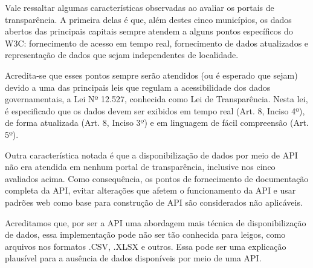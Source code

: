 Vale ressaltar algumas características observadas ao avaliar os portais de transparência. A primeira delas é que, além destes cinco municípios, os dados abertos das principais capitais sempre atendem a alguns pontos específicos do W3C: fornecimento de acesso em tempo real, fornecimento de dados atualizados e representação de dados que sejam independentes de localidade.

Acredita-se que esses pontos sempre serão atendidos (ou é esperado que sejam) devido a uma das principais leis que regulam a acessibilidade dos dados governamentais, a Lei Nº 12.527, conhecida como Lei de Transparência. Nesta lei, é especificado que os dados devem ser exibidos em tempo real (Art. 8, Inciso 4º), de forma atualizada (Art. 8, Inciso 3º) e em linguagem de fácil compreensão (Art. 5º).

Outra característica notada é que a disponibilização de dados por meio de API não era atendida em nenhum portal de transparência, inclusive nos cinco avaliados acima. Como consequência, os pontos de fornecimento de documentação completa da API, evitar alterações que afetem o funcionamento da API e usar padrões web como base para construção de API são considerados não aplicáveis.

Acreditamos que, por ser a API uma abordagem mais técnica de disponibilização de dados, essa implementação pode não ser tão conhecida para leigos, como arquivos nos formatos .CSV, .XLSX e outros. Essa pode ser uma explicação plausível para a ausência de dados disponíveis por meio de uma API.

